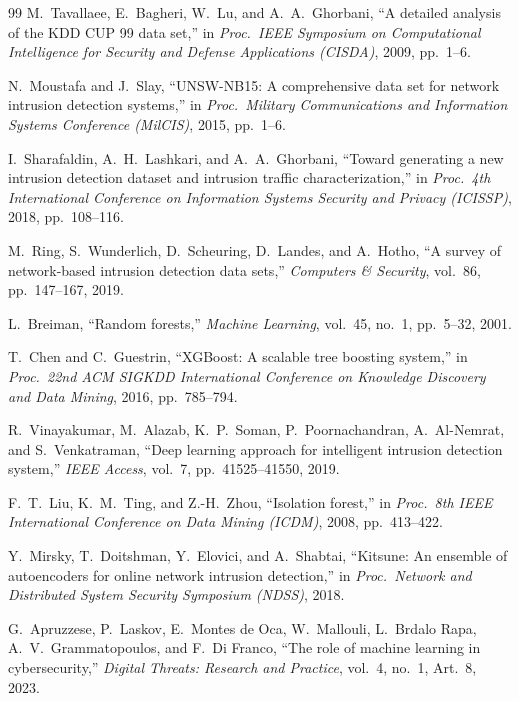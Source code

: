 \documentclass[12pt,a4paper,oneside]{article}
\begin{document}
\begin{thebibliography}{99}
 M.~Tavallaee, E.~Bagheri, W.~Lu, and A.~A.~Ghorbani, ``A detailed analysis of the KDD CUP 99 data set,'' in \emph{Proc.\ IEEE Symposium on Computational Intelligence for Security and Defense Applications (CISDA)}, 2009, pp.\ 1--6.

 N.~Moustafa and J.~Slay, ``UNSW-NB15: A comprehensive data set for network intrusion detection systems,'' in \emph{Proc.\ Military Communications and Information Systems Conference (MilCIS)}, 2015, pp.\ 1--6.

 I.~Sharafaldin, A.~H.~Lashkari, and A.~A.~Ghorbani, ``Toward generating a new intrusion detection dataset and intrusion traffic characterization,'' in \emph{Proc.\ 4th International Conference on Information Systems Security and Privacy (ICISSP)}, 2018, pp.\ 108--116.

 M.~Ring, S.~Wunderlich, D.~Scheuring, D.~Landes, and A.~Hotho, ``A survey of network-based intrusion detection data sets,'' \emph{Computers \& Security}, vol.~86, pp.\ 147--167, 2019.

 L.~Breiman, ``Random forests,'' \emph{Machine Learning}, vol.~45, no.~1, pp.\ 5--32, 2001.

 T.~Chen and C.~Guestrin, ``XGBoost: A scalable tree boosting system,'' in \emph{Proc.\ 22nd ACM SIGKDD International Conference on Knowledge Discovery and Data Mining}, 2016, pp.\ 785--794.

 R.~Vinayakumar, M.~Alazab, K.~P.~Soman, P.~Poornachandran, A.~Al-Nemrat, and S.~Venkatraman, ``Deep learning approach for intelligent intrusion detection system,'' \emph{IEEE Access}, vol.~7, pp.\ 41525--41550, 2019.

 F.~T.~Liu, K.~M.~Ting, and Z.-H.~Zhou, ``Isolation forest,'' in \emph{Proc.\ 8th IEEE International Conference on Data Mining (ICDM)}, 2008, pp.\ 413--422.

 Y.~Mirsky, T.~Doitshman, Y.~Elovici, and A.~Shabtai, ``Kitsune: An ensemble of autoencoders for online network intrusion detection,'' in \emph{Proc.\ Network and Distributed System Security Symposium (NDSS)}, 2018.

 G.~Apruzzese, P.~Laskov, E.~Montes de Oca, W.~Mallouli, L.~Brdalo Rapa, A.~V.~Grammatopoulos, and F.~Di Franco, ``The role of machine learning in cybersecurity,'' \emph{Digital Threats: Research and Practice}, vol.~4, no.~1, Art.\ 8, 2023.


\end{thebibliography}
\end{document}
